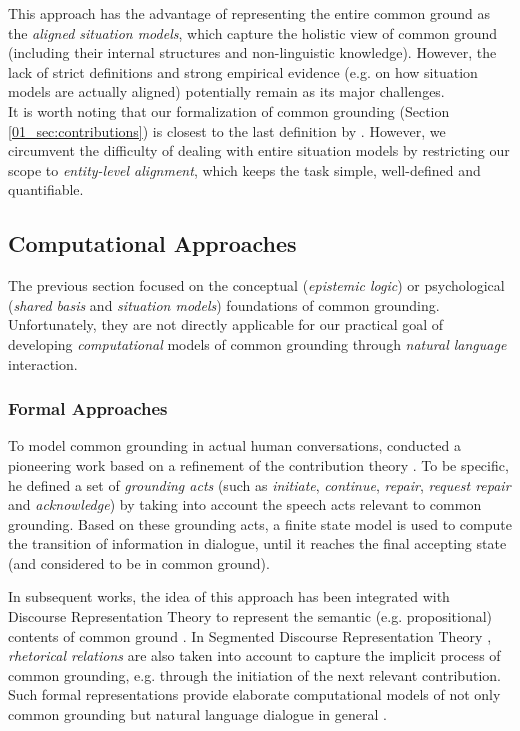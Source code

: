 This approach has the advantage of representing the entire common ground as the \textit{aligned situation models}, which capture the holistic view of common ground (including their internal structures and non-linguistic knowledge). However, the lack of strict definitions and strong empirical evidence (e.g. on how situation models are actually aligned) potentially remain as its major challenges.\\

It is worth noting that our formalization of common grounding (Section \ref{01_sec:contributions}) is closest to the last definition by \citet{pickering2004toward}. However, we circumvent the difficulty of dealing with entire situation models by restricting our scope to \textit{entity-level alignment}, which keeps the task simple, well-defined and quantifiable.

\subsection{Computational Approaches}
\label{02_subsec:computational_approaches}

The previous section focused on the conceptual (\textit{epistemic logic}) or psychological (\textit{shared basis} and \textit{situation models}) foundations of common grounding. Unfortunately, they are not directly applicable for our practical goal of developing \textit{computational} models of common grounding through \textit{natural language} interaction.

\subsubsection{Formal Approaches}

To model common grounding in actual human conversations, \citet{traum1994computational} conducted a pioneering work based on a refinement of the contribution theory \citep{clark1989contributing}. To be specific, he defined a set of \textit{grounding acts} (such as \textit{initiate}, \textit{continue}, \textit{repair}, \textit{request repair} and \textit{acknowledge}) by taking into account the speech acts \citep{austin1962things,searle1969speech} relevant to common grounding. Based on these grounding acts, a finite state model is used to compute the transition of information in dialogue, until it reaches the final accepting state (and considered to be in common ground).

In subsequent works, the idea of this approach has been integrated with Discourse Representation Theory \citep{Kamp1981-KAMATO-2,kampreyle93} to represent the semantic (e.g. propositional) contents of common ground \citep{poesio1997conversational}. In Segmented Discourse Representation Theory \citep{asher2003logics}, \textit{rhetorical relations} are also taken into account to capture the implicit process of common grounding, e.g. through the initiation of the next relevant contribution. Such formal representations provide elaborate computational models of not only common grounding but natural language dialogue in general \citep{ginzburg2012interactive}.

